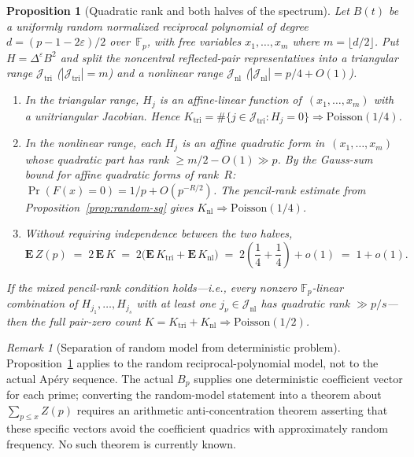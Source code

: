 \documentclass[11pt]{article}
\newtheorem{proposition}[theorem]{Proposition}
\theoremstyle{definition}
\theoremstyle{remark}
\newtheorem{remark}[theorem]{Remark}
\begin{document}
\begin{proposition}[Quadratic rank and both halves of the spectrum]%
\label{prop:quadratic-rank}
Let $B(t)$ be a uniformly random normalized reciprocal polynomial
of degree $d = (p-1-2\varepsilon)/2$ over~$\mathbb{F}_p$,
with free variables $x_1, \ldots, x_m$ where $m = \lfloor d/2 \rfloor$.
Put $H = \Delta^\varepsilon B^2$ and split the noncentral
reflected-pair representatives into a \emph{triangular} range
$\mathcal{J}_{\mathrm{tri}}$ ($|\mathcal{J}_{\mathrm{tri}}| = m$)
and a \emph{nonlinear} range
$\mathcal{J}_{\mathrm{nl}}$
($|\mathcal{J}_{\mathrm{nl}}| = p/4 + O(1)$).
\begin{enumerate}
\item[\textnormal{(i)}]
  In the triangular range, $H_j$ is an affine-linear function
  of~$(x_1,\ldots,x_m)$ with a unitriangular Jacobian.
  Hence $K_{\mathrm{tri}} = \#\{j \in \mathcal{J}_{\mathrm{tri}} :
  H_j = 0\} \Rightarrow \mathrm{Poisson}(1/4)$.
\item[\textnormal{(ii)}]
  In the nonlinear range, each $H_j$ is an affine quadratic
  form in~$(x_1,\ldots,x_m)$ whose quadratic part has rank
  $\ge m/2 - O(1) \gg p$.
  By the Gauss-sum bound for affine quadratic forms
  of rank~$R$:
  $\Pr(F(x) = 0) = 1/p + O(p^{-R/2})$.
  The pencil-rank estimate from
  Proposition~\ref{prop:random-sq} gives
  $K_{\mathrm{nl}} \Rightarrow \mathrm{Poisson}(1/4)$.
\item[\textnormal{(iii)}]
  Without requiring independence between the two halves,
  \[
    \mathbf{E}\,Z(p) \;=\; 2\,\mathbf{E}\,K
    \;=\; 2\bigl(\mathbf{E}\,K_{\mathrm{tri}}
      + \mathbf{E}\,K_{\mathrm{nl}}\bigr)
    \;=\; 2\!\left(\frac{1}{4} + \frac{1}{4}\right) + o(1)
    \;=\; 1 + o(1).
  \]
\end{enumerate}
If the mixed pencil-rank condition holds---i.e., every nonzero
$\mathbb{F}_p$-linear combination of $H_{j_1}, \ldots, H_{j_s}$
with at least one $j_\nu \in \mathcal{J}_{\mathrm{nl}}$ has
quadratic rank $\gg p/s$---then the full pair-zero count
$K = K_{\mathrm{tri}} + K_{\mathrm{nl}} \Rightarrow
\mathrm{Poisson}(1/2)$.
\end{proposition}

\begin{remark}[Separation of random model from deterministic problem]
Proposition~\ref{prop:quadratic-rank} applies to the
random reciprocal-polynomial model, not to the actual
Ap\'ery sequence.
The actual $B_p$ supplies one deterministic coefficient
vector for each prime; converting the random-model statement
into a theorem about $\sum_{p \le x} Z(p)$ requires
an arithmetic anti-concentration theorem asserting that these
specific vectors avoid the coefficient quadrics with
approximately random frequency.
No such theorem is currently known.
\end{remark}
\end{document}
